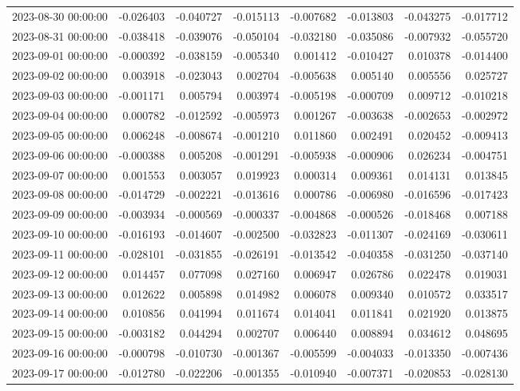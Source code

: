 \begin{tabular}{lrrrrrrr}
2023-08-30 00:00:00 & -0.026403 & -0.040727 & -0.015113 & -0.007682 & -0.013803 & -0.043275 & -0.017712 \\
2023-08-31 00:00:00 & -0.038418 & -0.039076 & -0.050104 & -0.032180 & -0.035086 & -0.007932 & -0.055720 \\
2023-09-01 00:00:00 & -0.000392 & -0.038159 & -0.005340 & 0.001412 & -0.010427 & 0.010378 & -0.014400 \\
2023-09-02 00:00:00 & 0.003918 & -0.023043 & 0.002704 & -0.005638 & 0.005140 & 0.005556 & 0.025727 \\
2023-09-03 00:00:00 & -0.001171 & 0.005794 & 0.003974 & -0.005198 & -0.000709 & 0.009712 & -0.010218 \\
2023-09-04 00:00:00 & 0.000782 & -0.012592 & -0.005973 & 0.001267 & -0.003638 & -0.002653 & -0.002972 \\
2023-09-05 00:00:00 & 0.006248 & -0.008674 & -0.001210 & 0.011860 & 0.002491 & 0.020452 & -0.009413 \\
2023-09-06 00:00:00 & -0.000388 & 0.005208 & -0.001291 & -0.005938 & -0.000906 & 0.026234 & -0.004751 \\
2023-09-07 00:00:00 & 0.001553 & 0.003057 & 0.019923 & 0.000314 & 0.009361 & 0.014131 & 0.013845 \\
2023-09-08 00:00:00 & -0.014729 & -0.002221 & -0.013616 & 0.000786 & -0.006980 & -0.016596 & -0.017423 \\
2023-09-09 00:00:00 & -0.003934 & -0.000569 & -0.000337 & -0.004868 & -0.000526 & -0.018468 & 0.007188 \\
2023-09-10 00:00:00 & -0.016193 & -0.014607 & -0.002500 & -0.032823 & -0.011307 & -0.024169 & -0.030611 \\
2023-09-11 00:00:00 & -0.028101 & -0.031855 & -0.026191 & -0.013542 & -0.040358 & -0.031250 & -0.037140 \\
2023-09-12 00:00:00 & 0.014457 & 0.077098 & 0.027160 & 0.006947 & 0.026786 & 0.022478 & 0.019031 \\
2023-09-13 00:00:00 & 0.012622 & 0.005898 & 0.014982 & 0.006078 & 0.009340 & 0.010572 & 0.033517 \\
2023-09-14 00:00:00 & 0.010856 & 0.041994 & 0.011674 & 0.014041 & 0.011841 & 0.021920 & 0.013875 \\
2023-09-15 00:00:00 & -0.003182 & 0.044294 & 0.002707 & 0.006440 & 0.008894 & 0.034612 & 0.048695 \\
2023-09-16 00:00:00 & -0.000798 & -0.010730 & -0.001367 & -0.005599 & -0.004033 & -0.013350 & -0.007436 \\
2023-09-17 00:00:00 & -0.012780 & -0.022206 & -0.001355 & -0.010940 & -0.007371 & -0.020853 & -0.028130 \\

\end{tabular}
